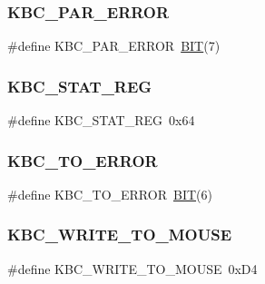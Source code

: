 \subsubsection{\texorpdfstring{K\+B\+C\+\_\+\+P\+A\+R\+\_\+\+E\+R\+R\+OR}{KBC\_PAR\_ERROR}}
{\footnotesize\ttfamily \#define K\+B\+C\+\_\+\+P\+A\+R\+\_\+\+E\+R\+R\+OR~\hyperlink{video__gr_8c_a3a8ea58898cb58fc96013383d39f482c}{B\+IT}(7)}

\hypertarget{group__i8042_ga34b14687d83496940a236351fbbb1aea}{}\label{group__i8042_ga34b14687d83496940a236351fbbb1aea} 
\subsubsection{\texorpdfstring{K\+B\+C\+\_\+\+S\+T\+A\+T\+\_\+\+R\+EG}{KBC\_STAT\_REG}}
{\footnotesize\ttfamily \#define K\+B\+C\+\_\+\+S\+T\+A\+T\+\_\+\+R\+EG~0x64}

\hypertarget{group__i8042_ga22767b69efd74d1f3631b8803a63b939}{}\label{group__i8042_ga22767b69efd74d1f3631b8803a63b939} 
\subsubsection{\texorpdfstring{K\+B\+C\+\_\+\+T\+O\+\_\+\+E\+R\+R\+OR}{KBC\_TO\_ERROR}}
{\footnotesize\ttfamily \#define K\+B\+C\+\_\+\+T\+O\+\_\+\+E\+R\+R\+OR~\hyperlink{video__gr_8c_a3a8ea58898cb58fc96013383d39f482c}{B\+IT}(6)}

\hypertarget{group__i8042_ga1747d582dc5a6d634f05016ece9625d8}{}\label{group__i8042_ga1747d582dc5a6d634f05016ece9625d8} 
\subsubsection{\texorpdfstring{K\+B\+C\+\_\+\+W\+R\+I\+T\+E\+\_\+\+T\+O\+\_\+\+M\+O\+U\+SE}{KBC\_WRITE\_TO\_MOUSE}}
{\footnotesize\ttfamily \#define K\+B\+C\+\_\+\+W\+R\+I\+T\+E\+\_\+\+T\+O\+\_\+\+M\+O\+U\+SE~0x\+D4}

